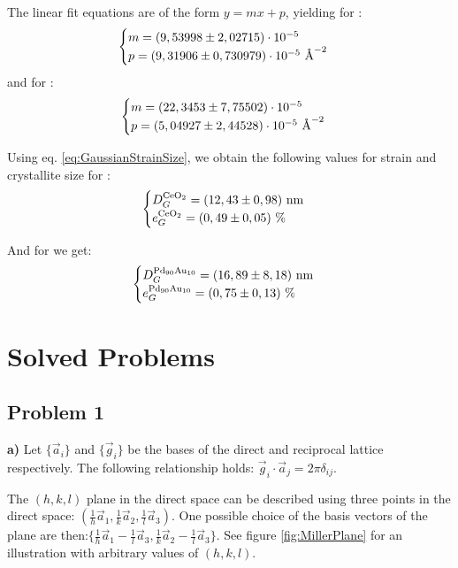 \documentclass[12pt]{article}
\begin{document}
The linear fit equations are of the form $y = mx+p$, yielding for :
\[
\begin{cases}
    m = (9,53998 \pm 2,02715) \cdot 10^{-5} \\
    p = (9,31906 \pm 0,730979) \cdot 10^{-5} \textup{~\AA}^{-2}
    
\end{cases}
\]
and for :
\[
\begin{cases}
    m = (22,3453 \pm 7,75502) \cdot 10^{-5} \\
    p = (5,04927 \pm 2,44528) \cdot 10^{-5} \textup{~\AA}^{-2}
\end{cases}
\]

Using eq. \ref{eq:GaussianStrainSize}, we obtain the following values for strain and crystallite size for :
\[
\begin{cases}
    D_G^{\ce{CeO2}} = (12,43 \pm 0,98) \ \text{nm}\\
    e_G^{\ce{CeO2}} = (0,49 \pm 0,05) \ \%
\end{cases}
\]

And for  we get:
\[
\begin{cases}
    D_G^{\ce{Pd90Au10}} = (16,89 \pm 8,18)\ \text{nm}\\
    e_G^{\ce{Pd90Au10}} = (0,75 \pm 0,13) \ \%
\end{cases}
\]

\newpage

\section{Solved Problems}

\subsection{Problem 1}
\textbf{a)} Let $\{\Vec{a}_i\}$ and $\{\Vec{g}_i\}$ be the bases of the direct and reciprocal lattice respectively. The following relationship holds: $\Vec{g}_i \cdot \Vec{a}_j = 2\pi \delta_{ij}$.

The $(h,k,l)$ plane in the direct space can be described using three points in the direct space: $(\frac{1}{h} \Vec{a}_1, \frac{1}{k} \Vec{a}_2, \frac{1}{l} \Vec{a}_3)$. One possible choice of the basis vectors of the plane are then:$\{ \frac{1}{h} \Vec{a}_1 - \frac{1}{l} \Vec{a}_3, \frac{1}{k} \Vec{a}_2 - \frac{1}{l} \Vec{a}_3 \}$. See figure \ref{fig:MillerPlane} for an illustration with arbitrary values of $(h,k,l)$.
\end{document}
